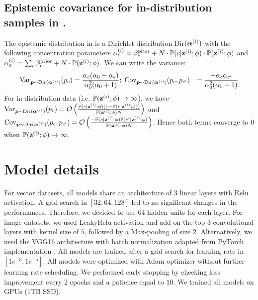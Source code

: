 \subsection{Epistemic covariance for in-distribution samples in \PostNetacro.}
\label{epistemic_variance_proof}

The epistemic distribution in \PostNetacro is a Dirichlet distribution Dir$(\bm{\alpha}^{(i)})$ with the following concentration parameters $\alpha_c^{(i)} = \beta_c^\text{prior} + N \cdot \mathbb{P}(c | \mathbf{z}^{(i)}; \phi) \cdot \mathbb{P}(\mathbf{z}^{(i)}; \phi)$ and $\alpha_0^{(i)} = \sum_c \beta_c^\text{prior} + N \cdot \mathbb{P}(\mathbf{z}^{(i)}; \phi)$. We can write the variance:
\begin{equation}
\begin{aligned}
\text{Var}_{\bm{p}\sim \mathrm{Dir}(\boldsymbol{\alpha}^{(i)})}(p_c) & = \frac{\alpha_c (\alpha_0 - \alpha_c)}{\alpha_0^2 (\alpha_0 + 1)}; \; \text{Cov}_{\bm{p}\sim \mathrm{Dir}(\boldsymbol{\alpha}^{(i)})}(p_c, p_{c'}) & = \frac{-\alpha_c\alpha_{c'}}{\alpha_0^2 (\alpha_0 + 1)}
\end{aligned}
\end{equation}
For in-distribution data (i.e. $\mathbb{P}(\mathbf{z}^{(i)}; \phi) \rightarrow \infty$), we have $\text{Var}_{\bm{p}\sim \mathrm{Dir}(\boldsymbol{\alpha}^{(i)})}(p_c) = \mathcal{O}\left(\frac{\mathbb{P}(c | \mathbf{z}^{(i)}; \phi)(1-\mathbb{P}(c | \mathbf{z}^{(i)}; \phi))}{\mathbb{P}(\mathbf{z}^{(i)}; \phi) N}\right)$ and $\text{Cov}_{\bm{p}\sim \mathrm{Dir}(\boldsymbol{\alpha}^{(i)})}(p_c, p_{c'}) = \mathcal{O}\left(\frac{-\mathbb{P}(c | \mathbf{z}^{(i)}; \phi)\mathbb{P}(c' | \mathbf{z}^{(i)}; \phi)}{\mathbb{P}(\mathbf{z}^{(i)}; \phi)N}\right)$. Hence both terms converge to $0$ when $\mathbb{P}(\mathbf{z}^{(i)}; \phi) \rightarrow \infty$.

\section{Model details}
\label{model_detais}

For vector datasets, all models share an architecture of 3 linear layers with Relu activation. A grid search in $[32, 64, 128]$ led to no significant changes in the performances. Therefore, we decided to use $64$ hidden units for each layer. For image datasets, we used LeakyRelu activation and add on the top 3 convolutional layers with kernel size of $5$, followed by a Max-pooling of size $2$. Alternatively, we used the VGG16 architecture with batch normalization \cite{vgg} adapted from PyTorch implementation \cite{pytorch}. All models are trained after a grid search for learning rate in $[1e^{-3}, 1e^{-5}]$. All models were optimized with Adam optimizer without further learning rate scheduling. We performed early stopping by checking loss improvement every $2$ epochs and a patience equal to $10$. We trained all models on GPUs (1TB SSD).

